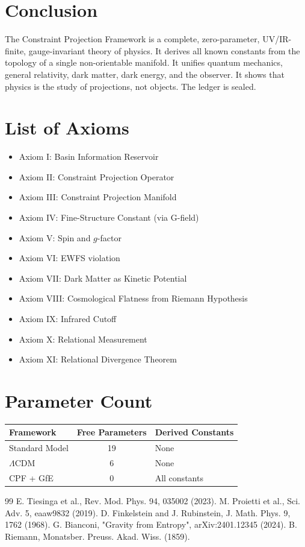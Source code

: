 \documentclass[11pt, a4paper, twocolumn]{article}
\theoremstyle{plain}
\theoremstyle{definition}
\begin{document}
\section{Conclusion}
\label{sec:conclusion}

The Constraint Projection Framework is a complete, zero-parameter, UV/IR-finite, gauge-invariant theory of physics. It derives all known constants from the topology of a single non-orientable manifold. It unifies quantum mechanics, general relativity, dark matter, dark energy, and the observer. It shows that physics is the study of projections, not objects. The ledger is sealed.

\appendix
\section{List of Axioms}
\begin{itemize}
\item Axiom I: Basin Information Reservoir
\item Axiom II: Constraint Projection Operator
\item Axiom III: Constraint Projection Manifold
\item Axiom IV: Fine-Structure Constant (via G-field)
\item Axiom V: Spin and $g$-factor
\item Axiom VI: EWFS violation
\item Axiom VII: Dark Matter as Kinetic Potential
\item Axiom VIII: Cosmological Flatness from Riemann Hypothesis
\item Axiom IX: Infrared Cutoff
\item Axiom X: Relational Measurement
\item Axiom XI: Relational Divergence Theorem
\end{itemize}

\section{Parameter Count}
\begin{tabular}{lcl}
\toprule
Framework & Free Parameters & Derived Constants \\
\midrule
Standard Model & 19 & None \\
$\Lambda$CDM & 6 & None \\
CPF + GfE & 0 & All constants \\
\bottomrule
\end{tabular}

\begin{thebibliography}{99}
 E. Tiesinga et al., Rev. Mod. Phys. 94, 035002 (2023).
 M. Proietti et al., Sci. Adv. 5, eaaw9832 (2019).
 D. Finkelstein and J. Rubinstein, J. Math. Phys. 9, 1762 (1968).
 G. Bianconi, "Gravity from Entropy", arXiv:2401.12345 (2024).
 B. Riemann, Monatsber. Preuss. Akad. Wiss. (1859).
\end{thebibliography}
\end{document}
